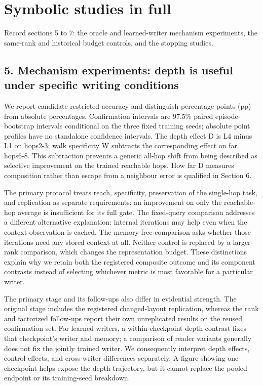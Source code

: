 \section{Symbolic studies in full}\label{app:E}
\noindent Record sections 5 to 7: the oracle and learned-writer mechanism experiments, the same-rank and historical budget controls, and the stopping studies.
\subsection*{5. Mechanism experiments: depth is useful under specific writing conditions}

We report candidate-restricted accuracy and distinguish percentage points (pp) from
absolute percentages. Confirmation intervals are 97.5\% paired episode-bootstrap  %
intervals conditional on the three fixed training seeds; absolute point profiles
have no standalone confidence intervals. The depth  %
effect D is L4 minus L1 on hops2-3; walk specificity W subtracts the corresponding
effect on far hops6-8. This subtraction prevents a generic all-hop shift from being
described as selective improvement on the trained reachable hops. How far D measures
composition rather than escape from a neighbour error is qualified in Section 6.

The primary protocol treats reach, specificity, preservation of the single-hop task,
and replication as separate requirements; an improvement on only the reachable-hop
average is insufficient for its full gate.  %
The fixed-query comparison addresses a different alternative explanation: internal
iterations may help even when the context observation is cached. The memory-free
comparison asks whether those iterations need any stored context at all. Neither
control is replaced by a larger-rank comparison, which changes the representation
budget. These distinctions explain why we retain both the registered composite
outcome and its component contrasts instead of selecting whichever metric is most
favorable for a particular writer.

The primary stage and its follow-ups also differ in evidential strength. The
original stage includes the registered changed-layout replication, whereas the
rank and factorized follow-ups report their own unreplicated results on the
reused confirmation set. For learned  %
writers, a within-checkpoint depth contrast fixes that checkpoint’s writer and
memory; a comparison of reader variants generally does not fix the jointly
trained writer. We consequently interpret depth effects,  %
control effects, and cross-writer differences separately. A figure showing one
checkpoint helps expose the depth trajectory, but it cannot replace the pooled
endpoint or its training-seed breakdown.

